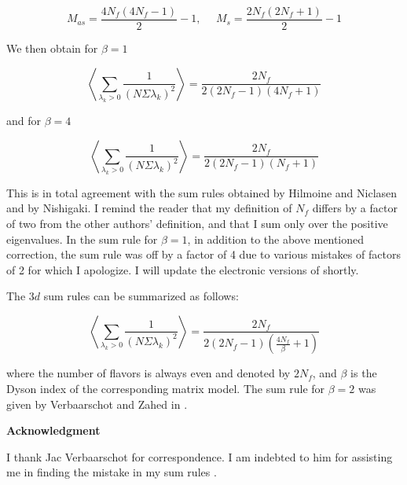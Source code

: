 \documentclass[a4paper,10pt]{article}
\begin{document}
\begin{equation}
M_{as}=\frac{4N_f(4N_f-1)}{2} - 1, \ \ \ \ \ \ M_s=\frac{2N_f(2N_f+1)}{2} - 1
\end{equation}

We then obtain for $\beta =1$ 

\begin{equation}
\left\langle \sum_{\lambda_k > 0} 
\frac{1}{(N\Sigma \lambda_k)^2} \right\rangle = \frac{2N_f}{2(2N_f-1)(4N_f+1)}
\end{equation}

and for $\beta =4$ 

\begin{equation}
\left\langle \sum_{\lambda_k > 0} 
\frac{1}{(N\Sigma \lambda_k)^2} \right\rangle = \frac{2N_f}{2(2N_f-1)(N_f+1)}
\end{equation}

This is in total agreement with the sum rules obtained by Hilmoine and 
Niclasen and by Nishigaki. I remind the reader that my definition of
$N_f$ differs by a factor of two from the other authors' definition, and that 
I sum only over the positive eigenvalues.
In the sum rule for $\beta =1$, in addition to the above mentioned 
correction, the sum rule was off by a factor of 4 due to various mistakes
of factors of 2 for which I apologize. I will
update the electronic versions of \cite{QCD3_1,QCD3_2} shortly.

The $3d$ sum rules can be summarized as follows:

\begin{equation}
\left\langle \sum_{\lambda_k > 0} 
\frac{1}{(N\Sigma \lambda_k)^2} \right\rangle = \frac{2N_f}{2(2N_f-1)
(\frac{4N_f}{\beta }+1)}
\end{equation}

where the number of flavors is always even and denoted by $2N_f$, and 
$\beta $ is the Dyson index of the corresponding matrix model.
The sum rule for $\beta =2$ was given by Verbaarschot and Zahed in \cite{V25}.
\vskip5mm

{\bf Acknowledgment}

I thank Jac Verbaarschot for correspondence. I am indebted to him for
assisting me in finding the mistake in my sum rules \cite{Jac}. 
\end{document}
